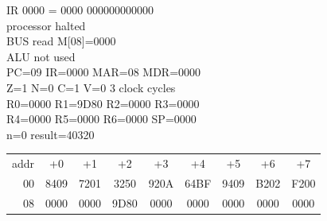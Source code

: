 \noindent\begin{tcolorbox}[stepbox, title={Step 44 \hfill PC 08 \quad HALT}]
\textcolor{dim}{IR} 0000 = 0000 000000000000\\
processor halted\\
\textcolor{dim}{BUS} read M[08]=0000\\
\textcolor{dim}{ALU} \textcolor{dim}{not used}\\
PC=09 IR=0000 MAR=08 MDR=0000\\
Z=1 N=0 C=1 V=0 \hfill \textcolor{dim}{3 clock cycles}\\
R0=0000 R1=9D80 R2=0000 R3=0000\\
R4=0000 R5=0000 R6=0000 SP=0000\\
\textcolor{dim}{n=0  result=40320}\\[1pt]
{\setlength{\tabcolsep}{1.6pt}\begin{tabular}{@{}r*{8}{c}@{}}
\textcolor{dim}{addr} & \textcolor{dim}{+0} & \textcolor{dim}{+1} & \textcolor{dim}{+2} & \textcolor{dim}{+3} & \textcolor{dim}{+4} & \textcolor{dim}{+5} & \textcolor{dim}{+6} & \textcolor{dim}{+7}\\
\textcolor{dim}{00} & 8409 & 7201 & 3250 & 920A & 64BF & 9409 & B202 & F200\\
\textcolor{dim}{08} & 0000 & \cellcolor{datac}0000 & \cellcolor{datac}9D80 & 0000 & 0000 & 0000 & 0000 & 0000\\
\end{tabular}}
\end{tcolorbox}\par\vspace{3pt}
